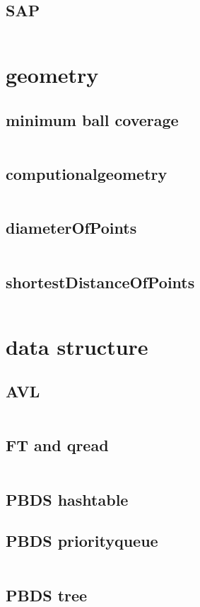   \subsection{SAP}
    \inputminted{cpp}{../code/graph/SAP.cpp}
\section{geometry}
  \subsection{minimum ball coverage}
    \inputminted{cpp}{../code/geometry/minimum_ball_coverage.cpp}
  \subsection{computionalgeometry}
    \inputminted{cpp}{../code/geometry/computionalgeometry.cpp}
  \subsection{diameterOfPoints}
    \inputminted{cpp}{../code/geometry/diameterOfPoints.cpp}
  \subsection{shortestDistanceOfPoints}
    \inputminted{cpp}{../code/geometry/shortestDistanceOfPoints.cpp}
\section{data structure}
  \subsection{AVL}
    \inputminted{cpp}{../code/data_structure/AVL.cpp}
  \subsection{FT and qread}
    \inputminted{cpp}{../code/data_structure/FT_and_qread.cpp}
  \subsection{PBDS hashtable}
  \subsection{PBDS priorityqueue}
    \inputminted{cpp}{../code/data_structure/PBDS_priorityqueue.cpp}
  \subsection{PBDS tree}
    \inputminted{cpp}{../code/data_structure/PBDS_tree.cpp}
